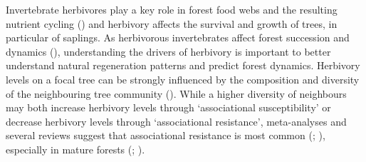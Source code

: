 \documentclass[b5paper,10pt]{book} %
\begin{document}
	Invertebrate herbivores play a key role in forest food webs and the resulting nutrient cycling (\citealt{Duffy2002}) and herbivory affects the survival and growth of trees, in particular of saplings. As herbivorous invertebrates affect forest succession and dynamics (\citealt{Bagchi2014}), understanding the drivers of herbivory is important to better understand natural regeneration patterns and predict forest dynamics. Herbivory levels on a focal tree can be strongly influenced by the composition and diversity of the neighbouring tree community (\citealt{Barbosa2009}). While a higher diversity of neighbours may both increase herbivory levels through ‘associational susceptibility’ or decrease herbivory levels through ‘associational resistance’, meta-analyses and several reviews suggest that associational resistance is most common (\citealt{Andow1991}; \citealt{Balvanera2006}), especially in mature forests (\citealt{Jactel2007}; \citealt{Castagneyrol2014}).
 
\end{document}
